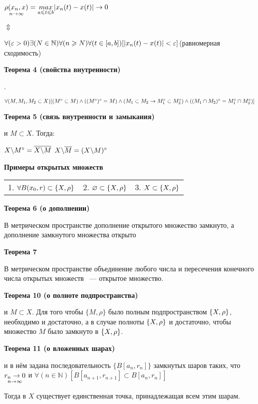 $\underset{n \rightarrow \infty }{\rho(x_n, x)}=\underset{a \leqslant t \leqslant b}{max}|x_n(t)-x(t)| \rightarrow 0$

\hspace*{30mm}$\Updownarrow$

$\forall(\varepsilon>0)\exists(N\in \mathbb{N})\forall(n\geqslant N)\forall(t\in[a, b])
[|x_n(t)-x(t)|<\varepsilon]$(равномерная сходимость)

\textbf{Теорема 4 (свойства внутренности)}

\MS. 

$\forall(M, M_1, M_2\subset X)[(M^{\circ} \subset M)
\wedge((M^{\circ})^{\circ}=M)
\wedge(M_1 \subset M_2 \rightarrow M_1^{\circ} \subset M_2^{\circ}) 
\wedge \\((M_1 \cap M_2)^{\circ}=M_1^{\circ} \cap  M_2^{\circ})]$

\textbf{Теорема 5 (связь внутренности и замыкания)}

\MS и $M \subset X$. Тогда:

$X\backslash M^{\circ}=\overline{X\backslash M}$ $X 
\backslash \overline M = (X \backslash M)^{\circ}$

\textbf{Примеры открытых множеств  }

\begin{tabular}{c c c}
    1. $\forall B(x_0, r)\subset \{X, \rho\} $& 
    2. $\varnothing \subset \{X, \rho\} $&
    3. $X \subset \{X, \rho\}$
\end{tabular}

\textbf{Теорема 6 (о дополнении)  }

В метрическом пространстве дополнение открытого множество замкнуто, 
а дополнение замкнутого множества открыто

\textbf{Теорема 7  }

В метрическом пространстве объединение любого числа и пересечения конечного числа 
открытых множеств ~--- открытое множество. 

\textbf{Теорема 10 (о полноте подпространства) }

\MS и $M \subset X$. Для того чтобы $ \{M, \rho\}$ было полным подпространством 
$\{X, \rho\}$, необходимо и достаточно, а в случае полноты $\{X, \rho\}$ и достаточно, чтобы 
множество $M$ было замкнуто в $\{X, \rho\}$.

\textbf{Теорема 11 (о вложенных шарах) }

\MS и в нём задана последовательность $ \{ B[a_n, r_n] \} $ замкнутых шаров таких, 
что $\underset{n \rightarrow \infty}{r_n \rightarrow 0}$ и $\forall(n \in \mathbb{N})[B[a_{n+1}, 
r_{n+1}]\subset B[a_n, r_n]]$

Тогда в $X$ существует единственная точка, принадлежащая всем этим шарам.

